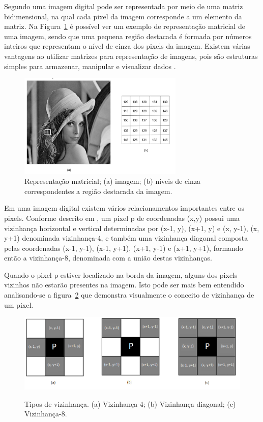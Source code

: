 Segundo  uma imagem digital pode ser representada por meio de uma matriz bidimensional, na qual cada pixel da imagem corresponde a um elemento da matriz. Na Figura~\ref{fig:imagem6} é possível ver um exemplo de representação matricial de uma imagem, sendo que uma pequena região destacada é formada por números inteiros que representam o nível de cinza dos pixels da imagem. Existem várias vantagens ao utilizar matrizes para representação de imagens, pois são estruturas simples para armazenar, manipular e visualizar dados \cite{PEDRINI2008}. 

 \begin{figure}[h!]
	\centering
	\includegraphics[width=0.7\textwidth]{Imagens/imagem6} 
	\caption[Representação matricial;]{Representação matricial; (a) imagem; (b) níveis de cinza correspondentes a região
destacada da imagem.}
	\label{fig:imagem6}
\end{figure}


Em uma imagem digital existem vários relacionamentos importantes entre os pixels. Conforme descrito em , 
um pixel p de coordenadas (x,y) possui uma vizinhança horizontal e vertical determinadas por (x-1, y), (x+1, y) e (x, y-1), (x, y+1) denominada vizinhança-4, e também uma vizinhança diagonal composta pelas coordenadas (x-1, y-1), (x-1, y+1), (x+1, y-1) e (x+1, y+1), formando então a vizinhança-8, denominada com a união destas vizinhanças.


Quando o pixel p estiver localizado na borda da imagem, alguns dos pixels vizinhos não estarão presentes na imagem. Isto pode ser mais bem entendido analisando-se a figura~\ref{fig:imagem3} que demonstra visualmente o conceito de vizinhança de um pixel.

 \begin{figure}[h]
	\centering
	\includegraphics[width=1.0\textwidth]{Imagens/imagem3} %
	\caption[Texto que vai aparecer na lista de fig.]{Tipos de vizinhança. (a) Vizinhança-4; (b) Vizinhança diagonal; (c) Vizinhança-8. }
	\label{fig:imagem3}
\end{figure}


